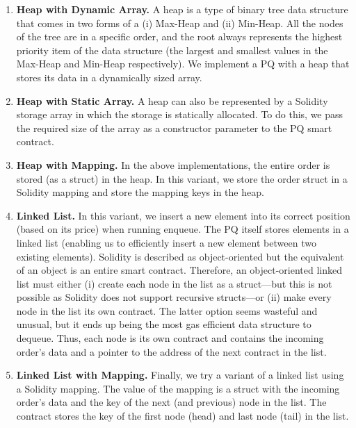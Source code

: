 \begin{enumerate}

\item \textbf{Heap with Dynamic Array.} A heap is a type of binary tree data structure that comes in two forms of a (i) Max-Heap and (ii) Min-Heap. All the nodes of the tree are in a specific order, and the root always represents the highest priority item of the data structure (the largest and smallest values in the Max-Heap and Min-Heap respectively). We implement a PQ with a heap that stores its data in a dynamically sized array.

\item \textbf{Heap with Static Array.} A heap can also be represented by a Solidity storage array in which the storage is statically allocated. To do this, we pass the required size of the array as a constructor parameter to the PQ smart contract.

\item \textbf{Heap with Mapping.} In the above implementations, the entire order is stored (as a struct) in the heap. In this variant, we store the order struct in a Solidity mapping and store the mapping keys in the heap.

\item \textbf{Linked List.} In this variant, we insert a new element into its correct position (based on its price) when running enqueue. The PQ itself stores elements in a linked list (enabling us to efficiently insert a new element between two existing elements). Solidity is described as object-oriented but the equivalent of an object is an entire smart contract. Therefore, an object-oriented linked list must either (i) create each node in the list as a struct---but this is not possible as Solidity does not support recursive structs---or (ii) make every node in the list its own contract. The latter option seems wasteful and unusual, but it ends up being the most gas efficient data structure to dequeue. Thus, each node is its own contract and contains the incoming order's data and a pointer to the address of the next contract in the list.

\item \textbf{Linked List with Mapping.} Finally, we try a variant of a linked list using a Solidity mapping. The value of the mapping is a struct with the incoming order's data and the key of the next (and previous) node in the list. The contract stores the key of the first node (head) and last node (tail) in the list.

\end{enumerate}

